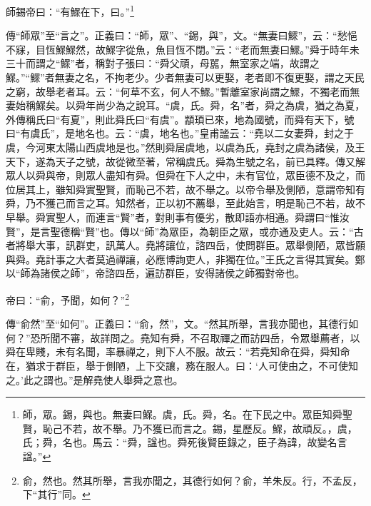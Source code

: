 師錫帝曰：“有鰥在下，曰。”\footnote{師，眾。錫，與也。無妻曰鰥。虞，氏。舜，名。在下民之中。眾臣知舜聖賢，恥己不若，故不舉。乃不獲已而言之。錫，星歷反。鰥，故頑反。，虞，氏；舜，名也。馬云：“舜，諡也。舜死後賢臣錄之，臣子為諱，故變名言諡。”}

{\noindent\zhuan{}\fzbyks 傳“師眾”至“言之”。正義曰：“師，眾”、“錫，與”，文。“無妻曰鰥”，云：“愁悒不寐，目恆鰥鰥然，故鰥字從魚，魚目恆不閉。”云：“老而無妻曰鰥。”舜于時年未三十而謂之“鰥”者，稱對子張曰：“舜父頑，母嚚，無室家之端，故謂之鰥。”“鰥”者無妻之名，不拘老少。少者無妻可以更娶，老者即不復更娶，謂之天民之窮，故舉老者耳。云：“何草不玄，何人不鰥。”暫離室家尚謂之鰥，不獨老而無妻始稱鰥矣。以舜年尚少為之說耳。“虞，氏。舜，名”者，舜之為虞，猶之為夏，外傳稱氏曰“有夏”，則此舜氏曰“有虞”。顓頊已來，地為國號，而舜有天下，號曰“有虞氏”，是地名也。云：“虞，地名也。”皇甫謐云：“堯以二女妻舜，封之于虞，今河東太陽山西虞地是也。”然則舜居虞地，以虞為氏，堯封之虞為諸侯，及王天下，遂為天子之號，故從微至著，常稱虞氏。舜為生號之名，前已具釋。傳又解眾人以舜與帝，則眾人盡知有舜。但舜在下人之中，未有官位，眾臣德不及之，而位居其上，雖知舜實聖賢，而恥己不若，故不舉之。以帝令舉及側陋，意謂帝知有舜，乃不獲己而言之耳。知然者，正以初不薦舉，至此始言，明是恥己不若，故不早舉。舜實聖人，而連言“賢”者，對則事有優劣，散即語亦相通。舜謂曰“惟汝賢”，是言聖德稱“賢”也。傳以“師”為眾臣，為朝臣之眾，或亦通及吏人。云：“古者將舉大事，訊群吏，訊萬人。堯將讓位，諮四岳，使問群臣。眾舉側陋，眾皆願與舜。堯計事之大者莫過禪讓，必應博詢吏人，非獨在位。”王氏之言得其實矣。鄭以“師為諸侯之師”，帝諮四岳，遍訪群臣，安得諸侯之師獨對帝也。 \par}

帝曰：“俞，予聞，如何？”\footnote{俞，然也。然其所舉，言我亦聞之，其德行如何？俞，羊朱反。行，不孟反，下“其行”同。}

{\noindent\zhuan{}\fzbyks 傳“俞然”至“如何”。正義曰：“俞，然”，文。“然其所舉，言我亦聞也，其德行如何？”恐所聞不審，故詳問之。堯知有舜，不召取禪之而訪四岳，令眾舉薦者，以舜在卑賤，未有名聞，率暴禪之，則下人不服。故云：“若堯知命在舜，舜知命在，猶求于群臣，舉于側陋，上下交讓，務在服人。曰：‘人可使由之，不可使知之。’此之謂也。”是解堯使人舉舜之意也。 \par}

